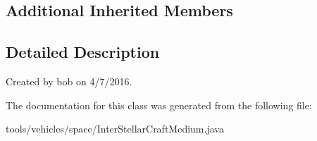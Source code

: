 \subsection*{Additional Inherited Members}


\subsection{Detailed Description}
Created by bob on 4/7/2016. 

The documentation for this class was generated from the following file\+:\begin{DoxyCompactItemize}
\item 
tools/vehicles/space/Inter\+Stellar\+Craft\+Medium.\+java\end{DoxyCompactItemize}

